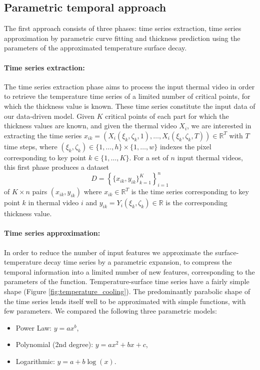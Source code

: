 \subsection{Parametric temporal approach} \label{Parametric Temporal approach}

The first approach consists of three phases: time series extraction, time series approximation by parametric curve fitting and thickness prediction using the parameters of the approximated temperature surface decay.

\paragraph{Time series extraction:} 

The time series extraction phase aims to process the input thermal video in order to retrieve the temperature time series of a limited number of critical points, for which the thickness value is known. These time series constitute the input data of our data-driven model. Given $K$ critical points of each part for which the thickness values are known, and given the thermal video $X_{i}$, we are interested in extracting the time series ${x}_{ik} = \left (X_{i}(\xi_{k}, \zeta_{k},1),\ldots,X_{i}(\xi_{k}, \zeta_{k},T) \right) \in \mathds{R}^{T}$ with $T$ time steps, where $(\xi_{k}, \zeta_{k}) \in \{1,\ldots,h\}\times\{1,\ldots,w\}$ indexes the pixel corresponding to key point $k \in \{1,\ldots,K\}$. For a set of $n$ input thermal videos, this first phase produces a dataset
\begin{equation}
    D = \left\{\{x_{ik},y_{ik}\}_{k=1}^K\right\}_{i=1}^n
\end{equation}
of $K \times n$ pairs $(x_{ik},y_{ik})$ where $x_{ik} \in \mathds{R}^{T}$ is the time series corresponding to key point $k$ in thermal video $i$ and $y_{ik} = Y_{i}(\xi_{k}, \zeta_{k}) \in \mathds{R}$ is the corresponding thickness value.


\paragraph{Time series approximation:}

In order to reduce the number of input features we approximate the surface-temperature decay time series by a parametric expansion,  to compress the temporal information into a limited number of new features, corresponding to the parameters of the function. Temperature-surface time series have a fairly simple shape (Figure \ref{fig:temperature_cooling}). The predominantly parabolic shape of the time series lends itself well to be approximated with simple functions, with few parameters. We compared the following three parametric models:
\begin{itemize}
    \item Power Law: $y=ax^b$,
    \item Polynomial (2nd degree): $y=ax^2+bx+c$,
    \item Logarithmic: $y=a+b\log(x)$.
\end{itemize}


